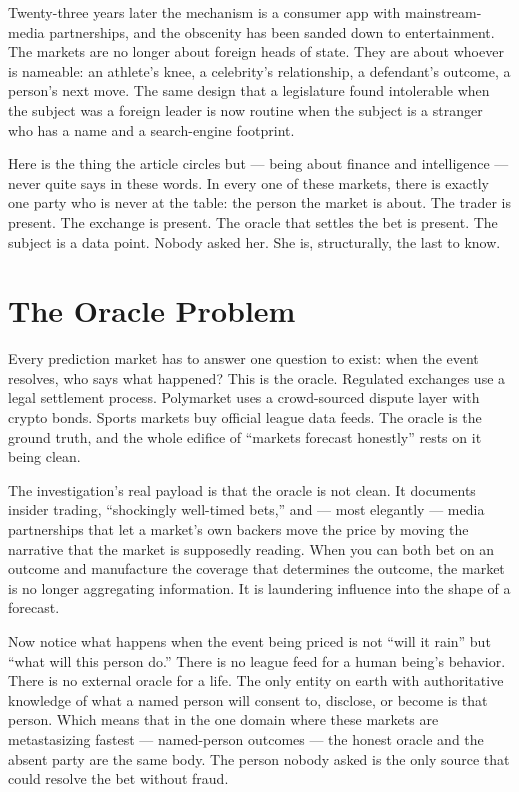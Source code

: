 \documentclass[11pt,letterpaper]{article}
\begin{document}
Twenty-three years later the mechanism is a consumer app with mainstream-media partnerships, and the obscenity has been sanded down to entertainment. The markets are no longer about foreign heads of state. They are about whoever is nameable: an athlete's knee, a celebrity's relationship, a defendant's outcome, a person's next move. The same design that a legislature found intolerable when the subject was a foreign leader is now routine when the subject is a stranger who has a name and a search-engine footprint.

Here is the thing the article circles but --- being about finance and intelligence --- never quite says in these words. In every one of these markets, there is exactly one party who is never at the table: the person the market is about. The trader is present. The exchange is present. The oracle that settles the bet is present. The subject is a data point. Nobody asked her. She is, structurally, the last to know.

\section{The Oracle Problem}

Every prediction market has to answer one question to exist: when the event resolves, who says what happened? This is the oracle. Regulated exchanges use a legal settlement process. Polymarket uses a crowd-sourced dispute layer with crypto bonds. Sports markets buy official league data feeds. The oracle is the ground truth, and the whole edifice of ``markets forecast honestly'' rests on it being clean.

The investigation's real payload is that the oracle is not clean. It documents insider trading, ``shockingly well-timed bets,'' and --- most elegantly --- media partnerships that let a market's own backers move the price by moving the narrative that the market is supposedly reading. When you can both bet on an outcome and manufacture the coverage that determines the outcome, the market is no longer aggregating information. It is laundering influence into the shape of a forecast.

Now notice what happens when the event being priced is not ``will it rain'' but ``what will this person do.'' There is no league feed for a human being's behavior. There is no external oracle for a life. The only entity on earth with authoritative knowledge of what a named person will consent to, disclose, or become is that person. Which means that in the one domain where these markets are metastasizing fastest --- named-person outcomes --- the honest oracle and the absent party are the same body. The person nobody asked is the only source that could resolve the bet without fraud.
\end{document}
